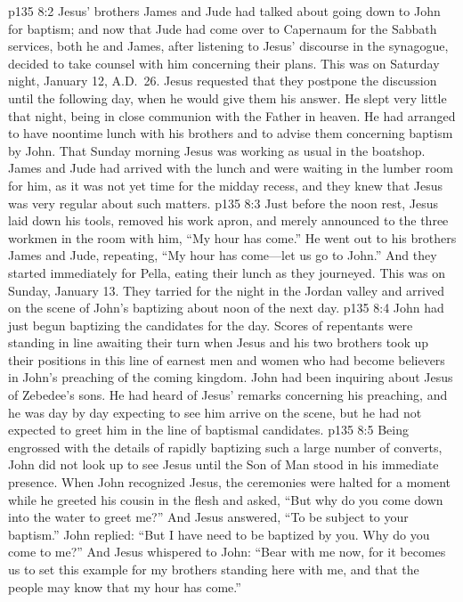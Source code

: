 \vs p135 8:2 Jesus’ brothers James and Jude had talked about going down to John for baptism; and now that Jude had come over to Capernaum for the Sabbath services, both he and James, after listening to Jesus’ discourse in the synagogue, decided to take counsel with him concerning their plans. This was on Saturday night, January 12, A.D.~26. Jesus requested that they postpone the discussion until the following day, when he would give them his answer. He slept very little that night, being in close communion with the Father in heaven. He had arranged to have noontime lunch with his brothers and to advise them concerning baptism by John. That Sunday morning Jesus was working as usual in the boatshop. James and Jude had arrived with the lunch and were waiting in the lumber room for him, as it was not yet time for the midday recess, and they knew that Jesus was very regular about such matters.
\vs p135 8:3 Just before the noon rest, Jesus laid down his tools, removed his work apron, and merely announced to the three workmen in the room with him, \textcolor{ubdarkred}{“My hour has come.”} He went out to his brothers James and Jude, repeating, \textcolor{ubdarkred}{“My hour has come---let us go to John.”} And they started immediately for Pella, eating their lunch as they journeyed. This was on Sunday, January 13. They tarried for the night in the Jordan valley and arrived on the scene of John’s baptizing about noon of the next day.
\pc \vs p135 8:4 John had just begun baptizing the candidates for the day. Scores of repentants were standing in line awaiting their turn when Jesus and his two brothers took up their positions in this line of earnest men and women who had become believers in John’s preaching of the coming kingdom. John had been inquiring about Jesus of Zebedee’s sons. He had heard of Jesus’ remarks concerning his preaching, and he was day by day expecting to see him arrive on the scene, but he had not expected to greet him in the line of baptismal candidates.
\vs p135 8:5 Being engrossed with the details of rapidly baptizing such a large number of converts, John did not look up to see Jesus until the Son of Man stood in his immediate presence. When John recognized Jesus, the ceremonies were halted for a moment while he greeted his cousin in the flesh and asked, “But why do you come down into the water to greet me?” And Jesus answered, \textcolor{ubdarkred}{“To be subject to your baptism.”} John replied: “But I have need to be baptized by you. Why do you come to me?” And Jesus whispered to John: \textcolor{ubdarkred}{“Bear with me now, for it becomes us to set this example for my brothers standing here with me, and that the people may know that my hour has come.”}
